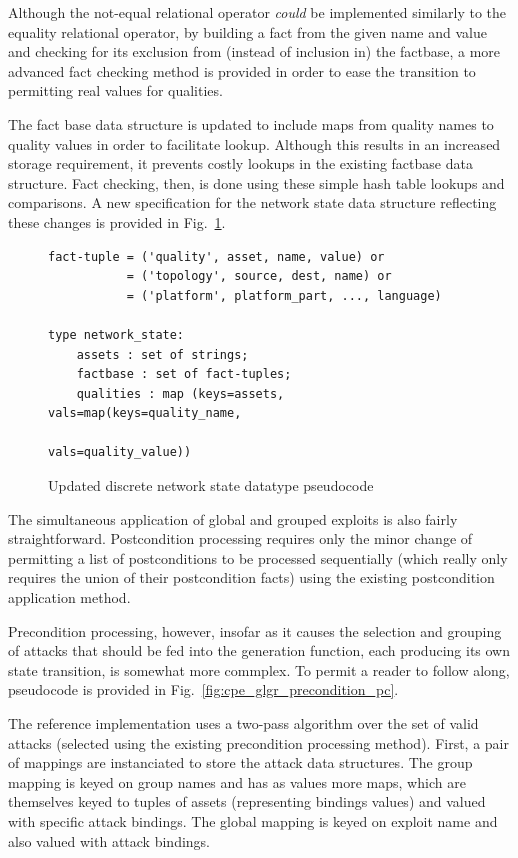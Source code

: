 Although the not-equal relational operator \emph{could} be implemented
similarly to the equality relational operator, by building a fact from the
given name and value and checking for its exclusion from (instead of inclusion 
in) the factbase, a more advanced fact checking method is provided in order 
to ease the transition to permitting real values for qualities.

The fact base data structure is updated to include maps from quality names to
quality values in order to facilitate lookup. Although this results in an
increased storage requirement, it prevents costly lookups in the existing
factbase data structure. Fact checking, then, is done using these simple hash
table lookups and comparisons. A new specification for the network state
data structure reflecting these changes is provided in 
Fig.~\ref{fig:netstate_map_pc}.

\begin{figure}
\begin{lstlisting}
fact-tuple = ('quality', asset, name, value) or
           = ('topology', source, dest, name) or
           = ('platform', platform_part, ..., language)

type network_state:
    assets : set of strings;
    factbase : set of fact-tuples;
    qualities : map (keys=assets, vals=map(keys=quality_name,
                                           vals=quality_value))
\end{lstlisting}
\caption{Updated discrete network state datatype pseudocode}
\label{fig:netstate_map_pc}
\end{figure}

The simultaneous application of global and grouped exploits is also
fairly straightforward. Postcondition processing requires only the minor change
of permitting a list of postconditions to be processed sequentially (which
really only requires the union of their postcondition facts) using the
existing postcondition application method.

Precondition processing, however, insofar as it causes the selection and
grouping of attacks that should be fed into the generation function,
each producing its own state transition, is somewhat more commplex. To permit
a reader to follow along, pseudocode is provided in 
Fig.~\ref{fig:cpe_glgr_precondition_pc}.

The reference implementation uses a two-pass algorithm over the set of
valid attacks (selected using the existing precondition processing method).
First, a pair of mappings are instanciated to store the attack data structures.
The group mapping is keyed on group names and has as values more maps, which are
themselves keyed to tuples of assets (representing bindings values) and valued
with specific attack bindings. The global mapping is keyed on exploit name
and also valued with attack bindings.


